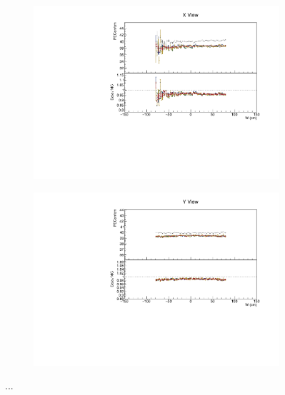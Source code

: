 \documentclass[12pt,a4paper]{article}
\begin{document}
\begin{figure}[!ht]
\begin{subfigure}{0.5\textwidth}
  \end{subfigure}
  \begin{subfigure}{0.5\textwidth}
    \includegraphics[width=\linewidth]{essentialsec_tb/pecorrcm_w_x.pdf}
  \end{subfigure}
  \begin{subfigure}{0.5\textwidth}
    \includegraphics[width=\linewidth]{essentialsec_tb/pecorrcm_w_y.pdf}
  \end{subfigure}
  \caption{...}
  \label{figAbsCalibW1}
\end{figure}
\end{document}
